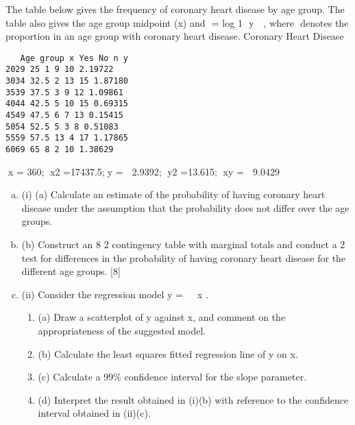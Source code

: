 \documentclass[a4paper,12pt]{article}
\begin{document}
 


The table below gives the frequency of coronary heart disease by age group. The
table also gives the age group midpoint (x) and

= log 1 
y
  
     
, where  denotes the
proportion in an age group with coronary heart disease.
Coronary Heart
Disease
\begin{verbatim}
   Age group x Yes No n y
2029 25 1 9 10 2.19722
3034 32.5 2 13 15 1.87180
3539 37.5 3 9 12 1.09861
4044 42.5 5 10 15 0.69315
4549 47.5 6 7 13 0.15415
5054 52.5 5 3 8 0.51083
5559 57.5 13 4 17 1.17865
6069 65 8 2 10 1.38629 
\end{verbatim}

x = 360; x2 =17437.5;y =  2.9392; y2 =13.615; xy =  9.0429
\begin{enumerate}[(a)]
\item (i) (a) Calculate an estimate of the probability of having coronary heart
disease under the assumption that the probability does not differ over
the age groups.
\item (b) Construct an 8 	 2 contingency table with marginal totals and conduct
a 2
 test for differences in the probability of having coronary heart
disease for the different age groups. [8]
\item (ii) Consider the regression model y =  x .

\begin{enumerate}
    \item (a) Draw a scatterplot of y against x, and comment on the appropriateness
of the suggested model.
    \item (b) Calculate the least squares fitted regression line of y on x.
    \item (c) Calculate a 99\% confidence interval for the slope parameter.
    \item (d) Interpret the result obtained in (i)(b) with reference to the confidence
interval obtained in (ii)(c). 
\end{enumerate}

\end{enumerate}
\end{document}
